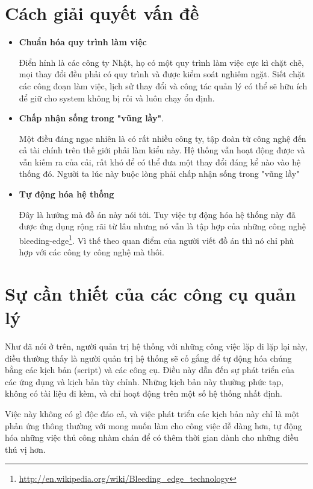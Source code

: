 \section{Cách giải quyết vấn đề}
\begin{itemize}
\item \textbf{Chuẩn hóa quy trình làm việc}

Điển hỉnh là các công ty Nhật, họ có một quy trình làm việc cực kì chặt chẽ, mọi thay đổi đều phải có quy trình và được kiểm soát nghiêm ngặt. Siết chặt các công đoạn làm việc, lịch sử thay đổi và công tác quản lý có thể sẽ hữu ích để giữ cho system không bị rối và luôn chạy ổn định.

\item \textbf{Chấp nhận sống trong "vũng lầy"}. 

Một điều đáng ngạc nhiên là có rất nhiều công ty, tập đoàn từ công nghệ đến cả tài chính trên thế giới phải làm kiểu này. Hệ thống vẫn hoạt động được và vẫn kiếm ra của cải, rất khó để có thể đưa một thay đổi đáng kể nào vào hệ thống đó. Người ta lúc này buộc lòng phải chấp nhận sống trong "vũng lầy"

\item \textbf{Tự động hóa hệ thống}

Đây là hướng mà đồ án này nói tới. Tuy việc tự động hóa hệ thống này đã được ứng dụng rộng rãi từ lâu nhưng nó vẫn là tập hợp của những công nghệ bleeding-edge\footnote{\url{http://en.wikipedia.org/wiki/Bleeding_edge_technology}}. Vì thế theo quan điểm của người viết đồ án thì nó chỉ phù hợp với các công ty công nghệ mà thôi.

\end{itemize}

\newpage
\clearpage

\section{Sự cần thiết của các công cụ quản lý}

Như đã nói ở trên, người quản trị hệ thống với những công việc lặp đi lặp lại này, điều thường thấy là người quản trị hệ thống sẽ cố gắng để tự động hóa chúng bằng các kịch bản (script) và các công cụ. Điều này dẫn đến sự phát triển của các ứng dụng và kịch bản tùy chỉnh. Những kịch bản này thường phức tạp, không có tài liệu đi kèm, và chỉ hoạt động trên một số hệ thống nhất định.

Việc này không có gì độc đáo cả, và việc phát triển các kịch bản này chỉ là một phản ứng thông thường với mong muốn làm cho công việc dễ dàng hơn, tự động hóa những việc thủ công nhàm chán để có thêm thời gian dành cho những điều thú vị hơn.

